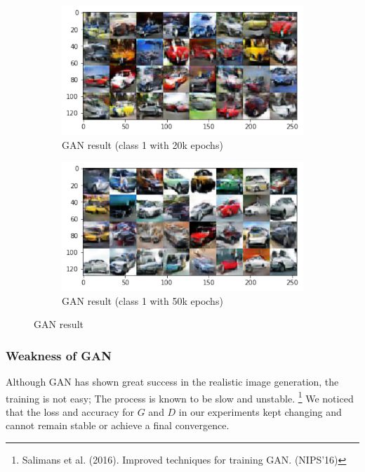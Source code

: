 \documentclass{article}
\begin{document}
\begin{figure}[h!]
     \centering
     \begin{subfigure}[b]{0.49\textwidth}
         \centering
         \includegraphics[width=.9\textwidth]{lab4/Class1 20000epochs 32batch.pdf}
         \caption{GAN result (class 1 with 20k epochs)}
         \label{fig:gan20k}
     \end{subfigure}
     \hfill
     \begin{subfigure}[b]{0.49\textwidth}
         \centering
         \includegraphics[width=.9\textwidth]{lab4/Class1 50000epochs 32batch.pdf}
         \caption{GAN result (class 1 with 50k epochs)}
         \label{fig:gan50k}
     \end{subfigure}
        \caption{GAN result}
        \label{fig:ganresult}
\end{figure}


\subsubsection{Weakness of GAN}
Although GAN has shown great success in the realistic image generation, the training is not easy; The process is known to be slow and unstable. \footnote{Salimans et al. (2016). Improved techniques for training GAN. (NIPS’16)} We noticed that the loss and accuracy for $G$ and $D$ in our experiments kept changing and cannot remain stable or achieve a final convergence.
\end{document}
